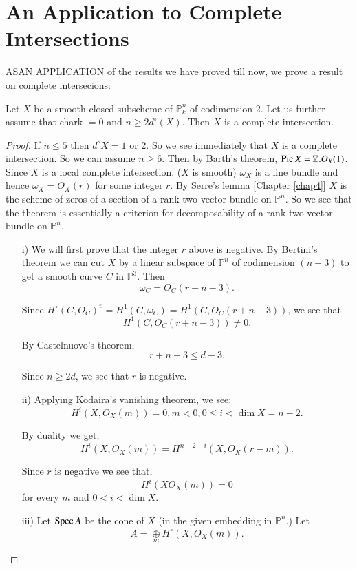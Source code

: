 
\chapter{An Application to Complete Intersections}\label{chap5}

AS\pageoriginale AN APPLICATION of the results we have proved till
now, we prove a result on complete intersecions:
\begin{THM*}
Let $X$ be a smooth closed subscheme of $\mathbb{P}_k^n$ of
codimension 2. Let us further assume that chark $=0$ and $n\geq
2d^\circ(X)$. Then $X$ is a complete intersection.
\end{THM*}

\begin{proof}
If $n\leq 5$ then $d^\circ X=1$ or 2. So we see immediately that $X$
is a complete intersection. So we can assume $n\geq 6$. Then by
Barth's theorem, $\operatorname{Pic} X=\mathbb{Z}.O_X(1)$. Since $X$ is a local
complete intersection, ($X$ is smooth) $\omega_X$ is a line bundle and
hence $\omega_X=O_X(r)$ for some integer $r$. By Serre's lemma
[Chapter \ref{chap4}] $X$ is the scheme of zeros of a section of a
rank two vector bundle on $\mathbb{P}^n$. So we see that the theorem
is essentially a criterion for decomposability of a rank two vector
bundle on $\mathbb{P}^n$. 
\begin{itemize}
\item [i)] We will first prove that the integer $r$ above is
  negative. By Bertini's theorem we can cut $X$ by a linear subspace
  of $\mathbb{P}^n$ of codimension $(n-3)$ to get a smooth curve $C$
  in $\mathbb{P}^3$. Then 
$$
\omega_C=O_C(r+n-3).
$$

Since $H^\circ(C,O_C)^v=H^1(C,\omega_C)=H^1(C,O_C(r+n-3))$, we see
that 
$$
H^1(C,O_C(r+n-3))\neq 0.
$$

By Castelnuovo's theorem,
$$
r+n-3\leq d-3.
$$

Since $n\geq 2d$, we see that $r$ is negative.
\item [ii)] Applying Kodaira's vanishing theorem, we see:
$$
H^i(X,O_X(m))=0,m<0,0\leq i<\dim X=n-2.
$$\pageoriginale

By duality we get,
$$
H^i(X,O_X(m))=H^{n-2-i}(X,O_X(r-m)).
$$

Since $r$ is negative we see that,
$$
H^i(XO_X(m))=0
$$
for every $m$ and $0< i<\dim X$.
\item [iii)] Let $\operatorname{Spec} A$ be the cone of $X$ (in the given embedding
  in $\mathbb{P}^n$.) Let 
$$
\bar{A}=\underset{m}{\oplus} H^\circ(X,O_X(m)).
$$


\end{itemize}
\end{proof}

